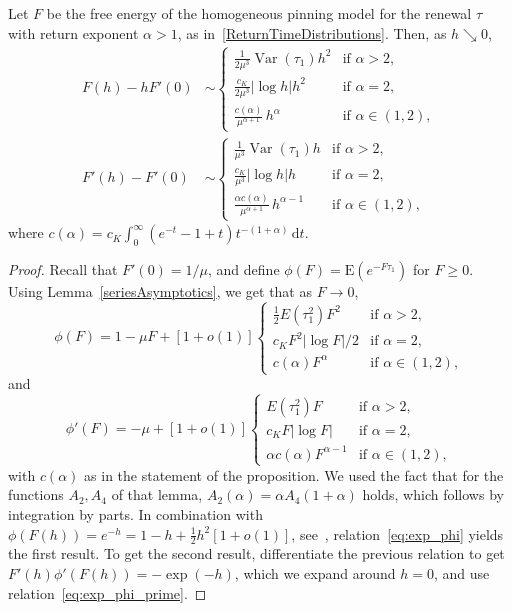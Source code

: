 \documentclass[10pt]{amsart}
\theoremstyle{definition}\newtheorem{defi}[theo]{Definition}\newtheorem{rema}[theo]{Remark}\newtheorem{exam}[theo]{Example}\newtheorem{exem}[theo]{Example}\newtheorem{nota}[theo]{Notation}
\DeclareMathOperator{\var}{\ensuremath{\PEfont Var}}
\newcommand{\ga}{\alpha}
\newcommand{\dd}{\mathrm{d}}
\newcommand{\PEfont}{\mathrm}
\newcommand\bE{\ensuremath{\mathrm{E}}}
\begin{document}
\begin{prop}\label{pr:asympt.hom.free.energy}
Let $F$ be the free energy of the homogeneous pinning model for the renewal $\tau$ with return exponent $\ga > 1$, as in~\eqref{ReturnTimeDistributions}. Then, as $h \searrow 0$,
\begin{equation}\label{eq:asymptoticsFh}
\begin{aligned}
F(h) - h F'(0) &\sim
\begin{cases}
\frac{1}{2 \mu^3} \var(\tau_1) h^2 & \text{if } \ga > 2,\\
\frac{c_K}{2 \mu^3} |\log h| h^2 & \text{if } \ga = 2,\\
\frac{c(\ga)}{\mu^{\ga + 1}} \, h^{\ga} & \text{if } \ga \in (1,2),
\end{cases}\\
F'(h) - F'(0) &\sim
\begin{cases}
\frac{1}{\mu^3} \var(\tau_1) h & \text{if } \ga > 2,\\
\frac{c_K}{\mu^3} |\log h| h & \text{if } \ga = 2,\\
\frac{\ga c(\ga)}{\mu^{\ga + 1}} \, h^{\ga - 1} & \text{if } \ga \in(1,2),
\end{cases}
\end{aligned}
\end{equation}
where $c(\ga) = c_K \int_0^\infty (e^{- t} - 1 + t) t^{- (1 + \ga)} \, \dd t$.
\end{prop}

\begin{proof}
Recall that $F'(0) = 1/\mu$, and define $\phi(F) = \bE(e^{- F \tau_1})$ for $F\geq 0$. Using Lemma~\ref{seriesAsymptotics}, we get that as $F\to 0$,
\begin{equation}\label{eq:exp_phi}
\phi(F) = 1 - \mu F + [1 + o(1)]
\begin{cases}
\frac{1}{2} E(\tau_1^2) F^2 & \text{if } \ga > 2,\\
c_K F^2|\log F|/2 & \text{if } \ga =2,\\
c(\ga) F^\ga & \text{if } \ga \in (1,2),
\end{cases}
\end{equation}
and
\begin{equation}\label{eq:exp_phi_prime}
\phi'(F) = - \mu + [1 + o(1)]
\begin{cases}
E(\tau_1^2) F & \text{if } \ga > 2,\\
c_K F |\log F| & \text{if } \ga =2,\\
\ga c(\ga) F^{\ga-1} & \text{if } \ga \in (1,2),
\end{cases}
\end{equation}
with $c(\ga)$ as in the statement of the proposition. We used the fact that for the functions $A_2, A_4$ of that lemma, $A_2(\ga)=\ga A_4(1+\ga)$ holds, which follows by integration by parts. In combination with $\phi(F(h)) = e^{- h} = 1 - h + \frac{1}{2} h^2 [1 + o(1)]$, see~\cite[Section~2.1, Equation (2.2)]{Gi2007}, relation~\eqref{eq:exp_phi} yields the first result. To get the second result, differentiate the previous relation to get $F'(h) \phi' (F(h)) = - \exp(- h)$, which we expand around $h = 0$, and use relation~\eqref{eq:exp_phi_prime}.
\end{proof}
\end{document}
